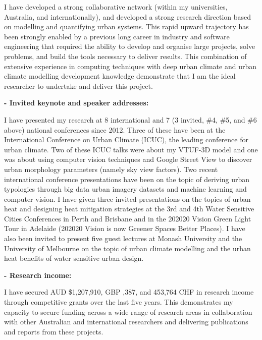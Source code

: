 I have developed a strong collaborative network (within my universities, Australia, and internationally), and developed a strong research direction based on modelling and quantifying urban systems. This rapid upward trajectory has been strongly enabled by a previous long career in industry and software engineering that required the ability to develop and organise large projects, solve problems, and build the tools necessary to deliver results. This combination of extensive experience in computing techniques with deep urban climate and urban climate modelling development knowledge demonstrate that I am the ideal researcher to undertake and deliver this project.


\textbf{- Invited keynote and speaker addresses:}

I have presented my research at 8 international and 7 (3 invited, \#4, \#5, and \#6 above) national conferences since 2012. Three of these have been at the International Conference on Urban Climate (ICUC), the leading conference for urban climate. Two of these ICUC talks were about my VTUF-3D model and one was about using computer vision techniques and Google Street View to discover urban morphology parameters (namely sky view factors). Two recent international conference presentations have been on the topic of deriving urban typologies through big data urban imagery datasets and machine learning and computer vision. I have given three invited presentations on the topics of urban heat and designing heat mitigation strategies at the 3rd and 4th Water Sensitive Cities Conferences in Perth and Brisbane and in the 202020 Vision Green Light Tour in Adelaide (202020 Vision is now Greener Spaces Better Places). I have also been invited to present five guest lectures at Monash University and the University of Melbourne on the topic of urban climate modelling and the urban heat benefits of water sensitive urban design. 

\textbf{- Research income:}

I have secured AUD \$1,207,910, GBP ,387, and 453,764 CHF in research income through competitive grants over the last five years. This demonstrates my capacity to secure funding across a wide range of research areas in collaboration with other Australian and international researchers and delivering publications and reports from these projects.

